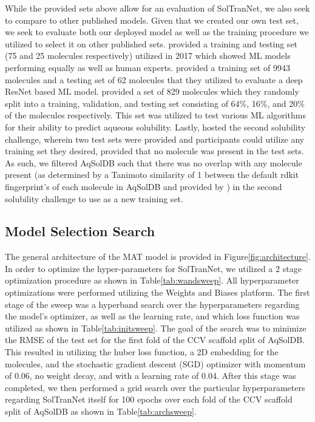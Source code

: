 \documentclass[journal=jmcmar,manuscript=article]{achemso}
\begin{document}
While the provided sets above allow for an evaluation of SolTranNet, we also seek to compare to other published models. Given that we created our own test set, we seek to evaluate both our deployed model as well as the training procedure we utilized to select it on other published sets.
\citet{boobier} provided a training and testing set (75 and 25 molecules respectively) utilized in 2017 which showed ML models performing equally as well as human experts.
\citet{cui} provided a training set of 9943 molecules and a testing set of 62 molecules that they utilized to evaluate a deep ResNet based ML model.
\citet{lovric} provided a set of 829 molecules which they randomly split into a training, validation, and testing set consisting of 64\%, 16\%, and 20\% of the molecules respectively.
This set was utilized to test various ML algorithms for their ability to predict aqueous solubility.
Lastly, \citet{llinas} hosted the second solubility challenge, wherein two test sets were provided and participants could utilize any training set they desired, provided that no molecule was present in the test sets.
As such, we filtered AqSolDB such that there was no overlap with any molecule present (as determined by a Tanimoto similarity of 1 between the default rdkit fingerprint's of each molecule in AqSolDB and provided by \citet{llinas}) in the second solubility challenge to use as a new training set.

\subsection{Model Selection Search}
The general architecture of the MAT model is provided in Figure\ref{fig:architecture}.
In order to optimize the hyper-parameters for SolTranNet, we utilized a 2 stage optimization procedure as shown in Table\ref{tab:wandsweep}.
All hyperparameter optimizations were performed utilizing the Weights and Biases platform\cite{wandb}.
The first stage of the sweep was a hyperband search over the hyperparameters regarding the model's optimizer, as well as the learning rate, and which loss function was utilized as shown in Table\ref{tab:initsweep}. The goal of the search was to minimize the RMSE of the test set for the first fold of the CCV scaffold split of AqSolDB.
This resulted in utilizing the huber loss function, a 2D embedding for the molecules, and the stochastic gradient descent (SGD) optimizer with momentum of 0.06, no weight decay, and with a learning rate of 0.04.
After this stage was completed, we then performed a grid search over the particular hyperparameters regarding SolTranNet itself for 100 epochs over each fold of the CCV scaffold split of AqSolDB as shown in Table\ref{tab:archsweep}.
\end{document}

